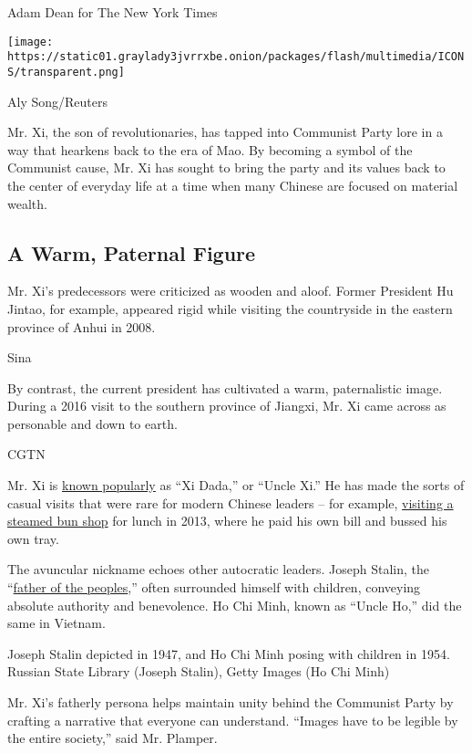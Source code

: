 Adam Dean for The New York Times

\texttt{[image: https://static01.graylady3jvrrxbe.onion/packages/flash/multimedia/ICONS/transparent.png]}

Aly Song/Reuters

Mr. Xi, the son of revolutionaries, has tapped into Communist Party lore
in a way that hearkens back to the era of Mao. By becoming a symbol of
the Communist cause, Mr. Xi has sought to bring the party and its values
back to the center of everyday life at a time when many Chinese are
focused on material wealth.

\hypertarget{a-warm-paternal-figure}{%
\subsection{A Warm, Paternal Figure}\label{a-warm-paternal-figure}}

Mr. Xi's predecessors were criticized as wooden and aloof. Former
President Hu Jintao, for example, appeared rigid while visiting the
countryside in the eastern province of Anhui in 2008.

Sina

By contrast, the current president has cultivated a warm, paternalistic
image. During a 2016 visit to the southern province of Jiangxi, Mr. Xi
came across as personable and down to earth.

CGTN

Mr. Xi is
\href{https://www.nytimes3xbfgragh.onion/2015/03/08/world/move-over-mao-beloved-papa-xi-awes-china.html}{known
popularly} as ``Xi Dada,'' or ``Uncle Xi.'' He has made the sorts of
casual visits that were rare for modern Chinese leaders -- for example,
\href{https://sinosphere.blogs.nytimes3xbfgragh.onion/2013/12/30/divining-chinas-direction-by-what-xi-ate/}{visiting
a steamed bun shop} for lunch in 2013, where he paid his own bill and
bussed his own tray.

The avuncular nickname echoes other autocratic leaders. Joseph Stalin,
the
``\href{http://press-files.anu.edu.au/downloads/press/n2129/html/ch03.xhtml?referer=2129\&page=9}{father
of the peoples},'' often surrounded himself with children, conveying
absolute authority and benevolence. Ho Chi Minh, known as ``Uncle Ho,''
did the same in Vietnam.

Joseph Stalin depicted in 1947, and Ho Chi Minh posing with children in
1954. Russian State Library (Joseph Stalin), Getty Images (Ho Chi Minh)

Mr. Xi's fatherly persona helps maintain unity behind the Communist
Party by crafting a narrative that everyone can understand. ``Images
have to be legible by the entire society,'' said Mr. Plamper.

